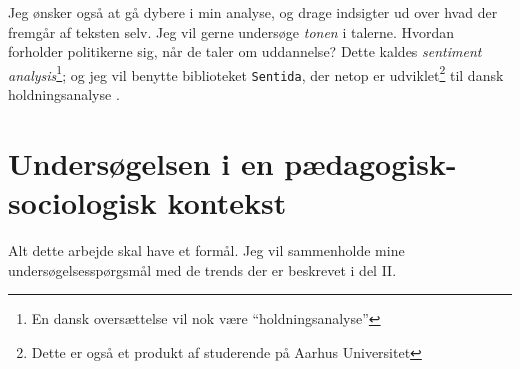 Jeg ønsker også at gå dybere i min analyse, og drage indsigter ud over hvad der fremgår af teksten selv.
Jeg vil gerne undersøge \textit{tonen} i talerne.
Hvordan forholder politikerne sig, når de taler om uddannelse?
Dette kaldes \textit{sentiment analysis}\footnote{En dansk oversættelse vil nok være “holdningsanalyse”}; og jeg vil benytte biblioteket \texttt{Sentida}, der netop er udviklet\footnote{Dette er også et produkt af studerende på Aarhus Universitet} til dansk holdningsanalyse \autocite{lauridsenSentida2020}.

\chapter{Undersøgelsen i en pædagogisk-sociologisk kontekst}\label{chap:edusoc}

Alt dette arbejde skal have et formål.
Jeg vil sammenholde mine undersøgelsesspørgsmål med de trends der er beskrevet i del II.

